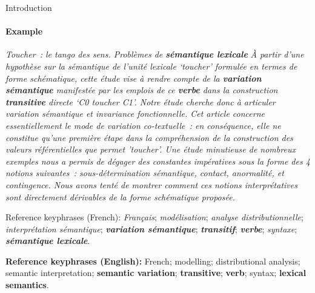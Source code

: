 \begin{frame}{Introduction}\framesubtitle{Example}
    \vfill{}
    \begin{exampleblock}{\normalsize
      \textit{Toucher~: le tango des sens. Problèmes de \textbf{sémantique lexicale}}
    }\justifying\footnotesize
      \textit{À partir d'une hypothèse sur la sémantique de l'unité lexicale `toucher' formulée en termes de forme schématique, cette étude vise à rendre compte de la \textbf{variation sémantique} manifestée par les emplois de ce \textbf{verbe} dans la construction \textbf{transitive} directe `C0 toucher C1'. Notre étude cherche donc à articuler variation sémantique et invariance fonctionnelle. Cet article concerne essentiellement le mode de variation co-textuelle~: en conséquence, elle ne constitue qu'une première étape dans la compréhension de la construction des valeurs référentielles que permet 'toucher'. Une étude minutieuse de nombreux exemples nous a permis de dégager des constantes impératives sous la forme des 4 notions suivantes~: sous-détermination sémantique, contact, anormalité, et contingence. Nous avons tenté de montrer comment ces notions interprétatives sont directement dérivables de la forme schématique proposée.}
    
      \begin{exampleblock}{\normalsize Reference keyphrases (French):}
        \textit{Français}; \textit{modélisation}; \textit{analyse distributionnelle}; \textit{interprétation sémantique}; \textbf{\textit{variation sémantique}}; \textbf{\textit{transitif}}; \textbf{\textit{verbe}}; \textit{syntaxe}; \textbf{\textit{sémantique lexicale}}.
      \end{exampleblock}
      
      \vspace{-.75em}
      
      \begin{exampleblock}{\normalsize \textbf{Reference keyphrases (English):}}
        French; modelling; distributional analysis; semantic interpretation; \textbf{semantic variation}; \textbf{transitive}; \textbf{verb}; syntax; \textbf{lexical semantics}.
      \end{exampleblock}
    \end{exampleblock}
    \vfill{}
\end{frame}

